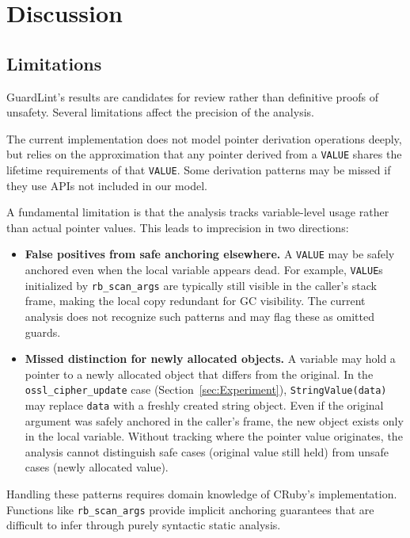 \section{Discussion}\label{sec:Discussion}

\subsection{Limitations}

GuardLint's results are candidates for review rather than definitive proofs of unsafety. Several limitations affect the precision of the analysis.

The current implementation does not model pointer derivation operations deeply, but relies on the approximation that any pointer derived from a \texttt{VALUE} shares the lifetime requirements of that \texttt{VALUE}. Some derivation patterns may be missed if they use APIs not included in our model.

A fundamental limitation is that the analysis tracks variable-level usage rather than actual pointer values. This leads to imprecision in two directions:

\begin{itemize}
\item \textbf{False positives from safe anchoring elsewhere.} A \texttt{VALUE} may be safely anchored even when the local variable appears dead. For example, \texttt{VALUE}s initialized by \texttt{rb\_scan\_args} are typically still visible in the caller's stack frame, making the local copy redundant for GC visibility. The current analysis does not recognize such patterns and may flag these as omitted guards.

\item \textbf{Missed distinction for newly allocated objects.} A variable may hold a pointer to a newly allocated object that differs from the original. In the \texttt{ossl\_cipher\_update} case (Section~\ref{sec:Experiment}), \texttt{StringValue(data)} may replace \texttt{data} with a freshly created string object. Even if the original argument was safely anchored in the caller's frame, the new object exists only in the local variable. Without tracking where the pointer value originates, the analysis cannot distinguish safe cases (original value still held) from unsafe cases (newly allocated value).
\end{itemize}

Handling these patterns requires domain knowledge of CRuby's implementation. Functions like \texttt{rb\_scan\_args} provide implicit anchoring guarantees that are difficult to infer through purely syntactic static analysis.

